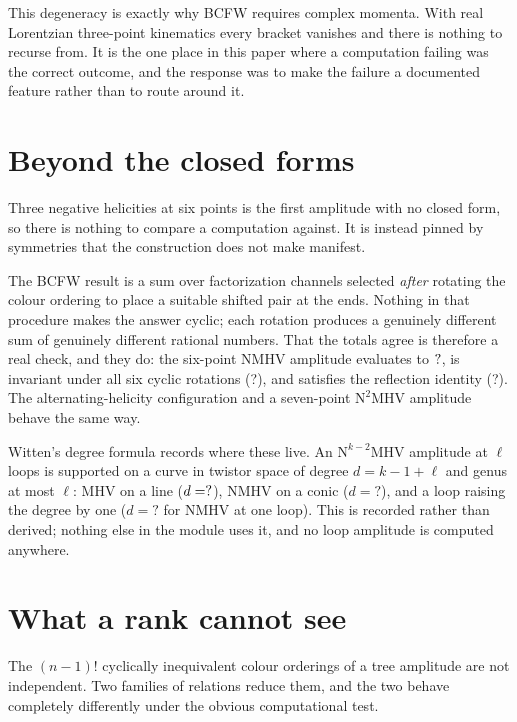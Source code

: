 \documentclass[11pt,a4paper]{article}
\newcommand{\TFNmhvCyclic}{?}\newcommand{\TFNmhvReflect}{?}
\newcommand{\TFDegreeNMHV}{?}\newcommand{\TFDegreeNMHVLoop}{?}
\theoremstyle{definition}
\begin{document}
This degeneracy is exactly why BCFW requires complex momenta. With real
Lorentzian three-point kinematics every bracket vanishes and there is nothing
to recurse from. It is the one place in this paper where a computation
failing was the correct outcome, and the response was to make the failure a
documented feature rather than to route around it.


\section{Beyond the closed forms}
\label{sec:nmhv}

Three negative helicities at six points is the first amplitude with no closed
form, so there is nothing to compare a computation against. It is instead
pinned by symmetries that the construction does not make manifest.

The BCFW result is a sum over factorization channels selected \emph{after}
rotating the colour ordering to place a suitable shifted pair at the ends.
Nothing in that procedure makes the answer cyclic; each rotation produces a
genuinely different sum of genuinely different rational numbers. That the
totals agree is therefore a real check, and they do: the six-point NMHV
amplitude evaluates to $?$, is invariant under all six cyclic
rotations (\TFNmhvCyclic), and satisfies the reflection identity
(\TFNmhvReflect). The alternating-helicity configuration and a seven-point
$\mathrm{N}^2$MHV amplitude behave the same way.

Witten's degree formula records where these live. An
$\mathrm{N}^{k-2}\mathrm{MHV}$ amplitude at $\ell$ loops is supported on a
curve in twistor space of degree $d = k - 1 + \ell$ and genus at most $\ell$:
MHV on a line ($d = ?$), NMHV on a conic
($d = \TFDegreeNMHV$), and a loop raising the degree by one
($d = \TFDegreeNMHVLoop$ for NMHV at one loop). This is recorded rather than
derived; nothing else in the module uses it, and no loop amplitude is
computed anywhere.


\section{What a rank cannot see}
\label{sec:relations}

The $(n-1)!$ cyclically inequivalent colour orderings of a tree amplitude are
not independent. Two families of relations reduce them, and the two behave
completely differently under the obvious computational test.
\end{document}
